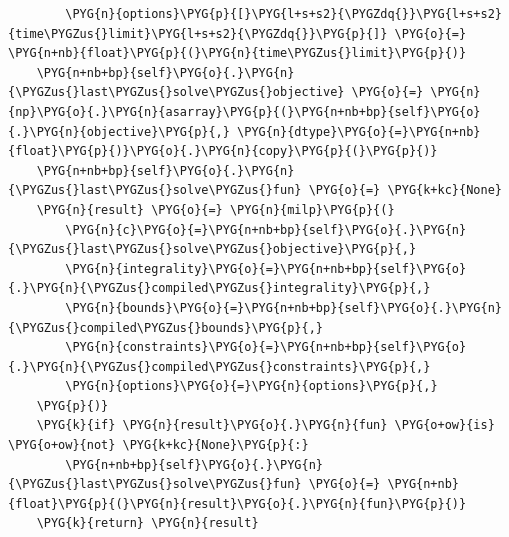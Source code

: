 \begin{Verbatim}
        \PYG{n}{options}\PYG{p}{[}\PYG{l+s+s2}{\PYGZdq{}}\PYG{l+s+s2}{time\PYGZus{}limit}\PYG{l+s+s2}{\PYGZdq{}}\PYG{p}{]} \PYG{o}{=} \PYG{n+nb}{float}\PYG{p}{(}\PYG{n}{time\PYGZus{}limit}\PYG{p}{)}
    \PYG{n+nb+bp}{self}\PYG{o}{.}\PYG{n}{\PYGZus{}last\PYGZus{}solve\PYGZus{}objective} \PYG{o}{=} \PYG{n}{np}\PYG{o}{.}\PYG{n}{asarray}\PYG{p}{(}\PYG{n+nb+bp}{self}\PYG{o}{.}\PYG{n}{objective}\PYG{p}{,} \PYG{n}{dtype}\PYG{o}{=}\PYG{n+nb}{float}\PYG{p}{)}\PYG{o}{.}\PYG{n}{copy}\PYG{p}{(}\PYG{p}{)}
    \PYG{n+nb+bp}{self}\PYG{o}{.}\PYG{n}{\PYGZus{}last\PYGZus{}solve\PYGZus{}fun} \PYG{o}{=} \PYG{k+kc}{None}
    \PYG{n}{result} \PYG{o}{=} \PYG{n}{milp}\PYG{p}{(}
        \PYG{n}{c}\PYG{o}{=}\PYG{n+nb+bp}{self}\PYG{o}{.}\PYG{n}{\PYGZus{}last\PYGZus{}solve\PYGZus{}objective}\PYG{p}{,}
        \PYG{n}{integrality}\PYG{o}{=}\PYG{n+nb+bp}{self}\PYG{o}{.}\PYG{n}{\PYGZus{}compiled\PYGZus{}integrality}\PYG{p}{,}
        \PYG{n}{bounds}\PYG{o}{=}\PYG{n+nb+bp}{self}\PYG{o}{.}\PYG{n}{\PYGZus{}compiled\PYGZus{}bounds}\PYG{p}{,}
        \PYG{n}{constraints}\PYG{o}{=}\PYG{n+nb+bp}{self}\PYG{o}{.}\PYG{n}{\PYGZus{}compiled\PYGZus{}constraints}\PYG{p}{,}
        \PYG{n}{options}\PYG{o}{=}\PYG{n}{options}\PYG{p}{,}
    \PYG{p}{)}
    \PYG{k}{if} \PYG{n}{result}\PYG{o}{.}\PYG{n}{fun} \PYG{o+ow}{is} \PYG{o+ow}{not} \PYG{k+kc}{None}\PYG{p}{:}
        \PYG{n+nb+bp}{self}\PYG{o}{.}\PYG{n}{\PYGZus{}last\PYGZus{}solve\PYGZus{}fun} \PYG{o}{=} \PYG{n+nb}{float}\PYG{p}{(}\PYG{n}{result}\PYG{o}{.}\PYG{n}{fun}\PYG{p}{)}
    \PYG{k}{return} \PYG{n}{result}
\end{Verbatim}
